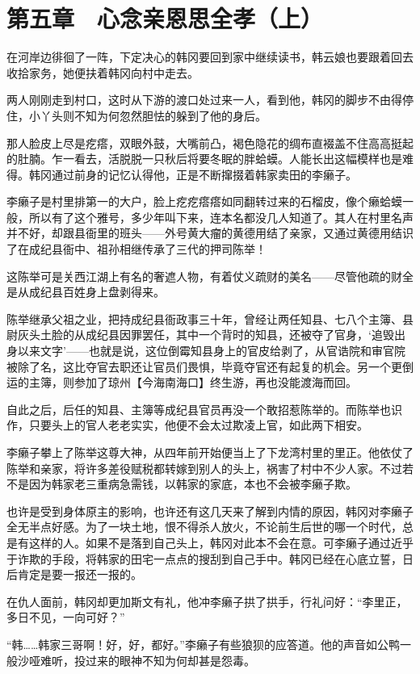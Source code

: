 \section{第五章　心念亲恩思全孝（上）}

在河岸边徘徊了一阵，下定决心的韩冈要回到家中继续读书，韩云娘也要跟着回去收拾家务，她便扶着韩冈向村中走去。

两人刚刚走到村口，这时从下游的渡口处过来一人，看到他，韩冈的脚步不由得停住，小丫头则不知为何忽然胆怯的躲到了他的身后。

那人脸皮上尽是疙瘩，双眼外鼓，大嘴前凸，褐色隐花的绸布直裰盖不住高高挺起的肚腩。乍一看去，活脱脱一只秋后将要冬眠的胖蛤蟆。人能长出这幅模样也是难得。韩冈通过前身的记忆认得他，正是不断撺掇着韩家卖田的李癞子。

李癞子是村里排第一的大户，脸上疙疙瘩瘩如同翻转过来的石榴皮，像个癞蛤蟆一般，所以有了这个雅号，多少年叫下来，连本名都没几人知道了。其人在村里名声并不好，却跟县衙里的班头——外号黄大瘤的黄德用结了亲家，又通过黄德用结识了在成纪县衙中、祖孙相继传承了三代的押司陈举！

这陈举可是关西江湖上有名的奢遮人物，有着仗义疏财的美名——尽管他疏的财全是从成纪县百姓身上盘剥得来。

陈举继承父祖之业，把持成纪县衙政事三十年，曾经让两任知县、七八个主簿、县尉灰头土脸的从成纪县因罪罢任，其中一个背时的知县，还被夺了官身，‘追毁出身以来文字’——也就是说，这位倒霉知县身上的官皮给剥了，从官诰院和审官院被除了名，这比夺官去职还让官员们畏惧，毕竟夺官还有起复的机会。另一个更倒运的主簿，则参加了琼州【今海南海口】终生游，再也没能渡海而回。

自此之后，后任的知县、主簿等成纪县官员再没一个敢招惹陈举的。而陈举也识作，只要头上的官人老老实实，他便不会太过欺凌上官，如此两下相安。

李癞子攀上了陈举这尊大神，从四年前开始便当上了下龙湾村里的里正。他依仗了陈举和亲家，将许多差役赋税都转嫁到别人的头上，祸害了村中不少人家。不过若不是因为韩家老三重病急需钱，以韩家的家底，本也不会被李癞子欺。

也许是受到身体原主的影响，也许还有这几天来了解到内情的原因，韩冈对李癞子全无半点好感。为了一块土地，恨不得杀人放火，不论前生后世的哪一个时代，总是有这样的人。如果不是落到自己头上，韩冈对此本不会在意。可李癞子通过近乎于诈欺的手段，将韩家的田宅一点点的搜刮到自己手中。韩冈已经在心底立誓，日后肯定是要一报还一报的。

在仇人面前，韩冈却更加斯文有礼，他冲李癞子拱了拱手，行礼问好：“李里正，多日不见，一向可好？”

“韩……韩家三哥啊！好，好，都好。”李癞子有些狼狈的应答道。他的声音如公鸭一般沙哑难听，投过来的眼神不知为何却甚是怨毒。

